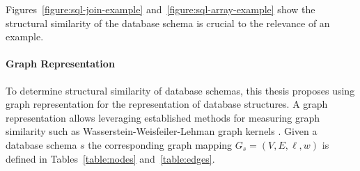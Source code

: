 Figures~\ref{figure:sql-join-example} and~\ref{figure:sql-array-example} show
the structural similarity of the database schema is crucial to
the relevance of an example.

\paragraph{Graph Representation}\label{design:graph-repr}

To determine structural similarity of database schemas, this thesis proposes
using graph representation for the representation of database structures. A
graph representation allows leveraging established methods for measuring graph
similarity such as Wasserstein-Weisfeiler-Lehman graph kernels \citep{WWL}. 
Given a database schema $s$ the corresponding graph mapping $G_s = (V, E, \ell,
w)$ is defined in Tables~\ref{table:nodes} and~\ref{table:edges}.

